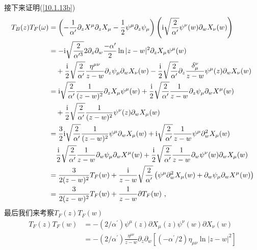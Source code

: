 \begin{tcolorbox}
接下来证明(\ref{10.1.13b})%
\begin{align*}
T_{B}(z)T_{F}(\omega ) &=\left( -\frac{1}{\alpha ^{\prime }}\partial
_{z}X^{\mu }\partial _{z}X_{\mu }-\frac{1}{2}\psi ^{\mu }\partial _{z}\psi
_{\mu }\right) \left( \mi\sqrt{\frac{2}{\alpha ^{\prime }}}\psi ^{\nu
}(w)\partial _{w}X_{\nu }(w)\right)  \\
&=-\mi\sqrt{\frac{2}{\alpha ^{\prime 3}}}2\partial _{z}\partial _{w}\frac{%
-\alpha ^{\prime }}{2}\ln |z-w|^{2}\partial _{z}X_{\mu }\psi ^{\mu }(w) \\
&\quad+\frac{\mi}{2}\sqrt{\frac{2}{\alpha ^{\prime }}}\frac{\eta ^{\mu \nu }}{z-w}%
\partial _{z}\psi _{\mu }\partial _{w}X_{\nu }(w)-\frac{\mi}{2}\sqrt{\frac{2}{%
\alpha ^{\prime }}}\partial _{z}\frac{\delta _{\mu }^{\nu }}{z-w}\psi ^{\mu
}(z)\partial _{w}X_{\nu }(w) \\
&=\mi\sqrt{\frac{2}{\alpha ^{\prime }}}\frac{1}{(z-w)^{2}}\partial _{z}X_{\mu
}\psi ^{\mu }(w)+\frac{\mi}{2}\sqrt{\frac{2}{\alpha ^{\prime }}}\frac{1}{z-w}%
\partial _{z}\psi _{\mu }\partial _{w}X^{\mu }(w) \\
&\quad+\frac{\mi}{2}\sqrt{\frac{2}{\alpha ^{\prime }}}\frac{1}{(z-w)^{2}}\psi
^{\nu }(z)\partial _{w}X_{\mu }(w) \\
&=\frac{3}{2}\mi\sqrt{\frac{2}{\alpha ^{\prime }}}\frac{1}{(z-w)^{2}}\psi
^{\mu }\partial _{w}X_{\mu }(w)+\mi\sqrt{\frac{2}{\alpha ^{\prime }}}\frac{1}{%
z-w}\psi ^{\mu }\partial _{w}^{2}X_{\mu }(w) \\
&\quad\frac{\mi}{2}\sqrt{\frac{2}{\alpha ^{\prime }}}\frac{1}{z-w}\partial
_{w}\psi _{\mu }\partial _{w}X^{\mu }(w)+\frac{\mi}{2}\sqrt{\frac{2}{\alpha
^{\prime }}}\frac{1}{z-w}\partial _{w}\psi ^{\nu }(w)\partial _{w}X_{\mu }(w)\\
&=\frac{3}{2(z-w)^{2}}T_{F}(w)+\frac{\mi}{z-w}\sqrt{\frac{2}{\alpha ^{\prime }%
}}\left( \psi ^{\mu }\partial _{w}^{2}X_{\mu }(w)+\partial _{w}\psi _{\mu
}\partial _{w}X^{\mu }(w)\right)  \\
&=\frac{3}{2(z-w)^{2}}T_{F}(w)+\frac{1}{z-w}\partial T_{F}(w)\text{ ,}
\end{align*}
最后我们来考察$T_{F}(z)T_{F}(w)$
\begin{align*}
T_{F}(z)T_{F}(w) &=-(2/\alpha ^{\prime })\psi ^{\mu }(z)\partial X_{\mu
}(z)\psi ^{\nu }(w)\partial X_{\nu }(w) \\
&=-(2/\alpha ^{\prime })\frac{\eta ^{\mu \nu }}{z-w}\partial _{z}\partial
_{w}[(-\alpha ^{\prime }/2)\eta _{\mu \nu }\ln |z-w|^{2}] \\

\end{align*}
\end{tcolorbox}
